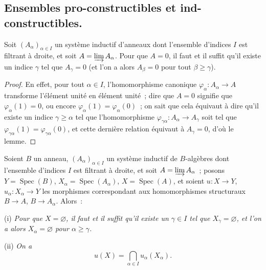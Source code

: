 \subsection{Ensembles pro-constructibles et ind-constructibles.}
\label{subsection:IV.1.9-fr}

\begin{lemma}[1.9.1]
\label{IV.1.9.1-fr}
Soit $(A_\alpha)_{\alpha\in I}$ un système inductif d'anneaux dont l'ensemble
d'indices $I$ est filtrant à droite, et soit $A=\varinjlim A_\alpha$. Pour que
$A=0$, il faut et il suffit qu'il existe un indice $\gamma$ tel que
$A_\gamma=0$ (et l'on a alors $A_\beta=0$ pour tout $\beta\geq\gamma$).
\end{lemma}

\begin{proof}
En effet, pour tout $\alpha\in I$, l'homomorphisme canonique
$\varphi_\alpha:A_\alpha\to A$ transforme l'élément unité en élément unité~;
dire que $A=0$ signifie que $\varphi_\alpha(1)=0$, ou encore
$\varphi_\alpha(1)=\varphi_\alpha(0)$~; on sait que cela équivaut à dire
qu'il existe un indice $\gamma\geq\alpha$ tel que l'homomorphisme
$\varphi_{\gamma\alpha}:A_\alpha\to A_\gamma$ soit tel que
$\varphi_{\gamma\alpha}(1)=\varphi_{\gamma\alpha}(0)$, et cette dernière
relation équivaut à $A_\gamma=0$, d'où le lemme.
\end{proof}

\begin{proposition}[1.9.2]
\label{IV.1.9.2-fr}
Soient $B$ un anneau, $(A_\alpha)_{\alpha\in I}$ un système inductif de
$B$-algèbres dont l'ensemble d'indices $I$ est filtrant à droite, et soit
$A=\varinjlim A_\alpha$~; posons $Y=\operatorname{Spec}(B)$,
$X_\alpha=\operatorname{Spec}(A_\alpha)$, $X=\operatorname{Spec}(A)$, et
soient $u:X\to Y$, $u_\alpha:X_\alpha\to Y$ les morphismes correspondant aux
homomorphismes structuraux $B\to A$, $B\to A_\alpha$. Alors~:
\end{proposition}

\label{IV.1.9.2.i-fr}%
(i) \emph{Pour que $X=\varnothing$, il faut et il suffit qu'il existe un
$\gamma\in I$ tel que $X_\gamma=\varnothing$, et l'on a alors
$X_\alpha=\varnothing$ pour $\alpha\geq\gamma$.}\par


(ii) {\label{IV.1.9.2.ii-fr}}\emph{On a}
\[
  u(X)=\bigcap_{\alpha\in I}u_\alpha(X_\alpha). \tag{1.9.2.1}
  \label{IV.1.9.2.1-fr}
\]

